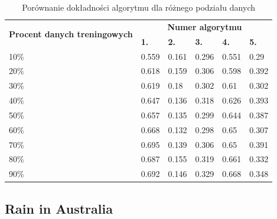 \documentclass[a4paper,11pt]{article}
\begin{document}
\begin{table}[]
\centering
\begin{tabular}{|l|l|l|l|l|l|}
\hline
\multicolumn{1}{|c|}{\multirow{2}{*}{\textbf{Procent danych treningowych}}} & \multicolumn{5}{c|}{\textbf{Numer algorytmu}}                       \\ \cline{2-6}
\multicolumn{1}{|c|}{}                                                      & \textbf{1.} & \textbf{2.} & \textbf{3.} & \textbf{4.} & \textbf{5.} \\ \hline
10\%                                                                        & 0.559       & 0.161       & 0.296       & 0.551       & 0.29        \\ \hline
20\%                                                                        & 0.618       & 0.159       & 0.306       & 0.598       & 0.392       \\ \hline
30\%                                                                        & 0.619       & 0.18        & 0.302       & 0.61        & 0.302       \\ \hline
40\%                                                                        & 0.647       & 0.136       & 0.318       & 0.626       & 0.393       \\ \hline
50\%                                                                        & 0.657       & 0.135       & 0.299       & 0.644       & 0.387       \\ \hline
60\%                                                                        & 0.668       & 0.132       & 0.298       & 0.65        & 0.307       \\ \hline
70\%                                                                        & 0.695       & 0.139       & 0.306       & 0.65        & 0.391       \\ \hline
80\%                                                                        & 0.687       & 0.155       & 0.319       & 0.661       & 0.332       \\ \hline
90\%                                                                        & 0.692       & 0.146       & 0.329       & 0.668       & 0.348       \\ \hline
\end{tabular}
\caption{Porównanie dokładności algorytmu dla różnego podziału danych}
\label{tab:caption}
\end{table}

\subsection{Rain in Australia}
\end{document}
